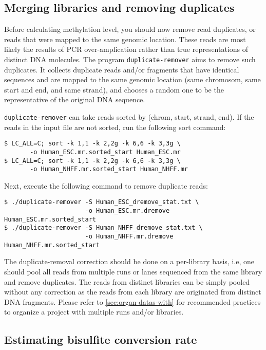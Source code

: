 \documentclass[10pt]{article}
\newcommand{\prog}[1]{\texttt{#1}}
\begin{document}
\subsection{Merging libraries and removing duplicates}
\label{sec:mapping}

Before calculating methylation level, you should now remove read
duplicates, or reads that were mapped to the same genomic
location. These reads are most likely the results of PCR
over-amplication rather than true representations of distinct DNA
molecules. The program \prog{duplicate-remover} aims to remove such
duplicates. It collects duplicate reads and/or fragments that have
identical sequences and are mapped to the same genomic location (same
chromosom, same start and end, and same strand), and chooses a random
one to be the representative of the original DNA sequence.

\prog{duplicate-remover} can take reads sorted by (chrom, start,
strand, end). If the reads in the input file are not sorted, run the
following sort command:
\begin{verbatim}
$ LC_ALL=C; sort -k 1,1 -k 2,2g -k 6,6 -k 3,3g \
       -o Human_ESC.mr.sorted_start Human_ESC.mr
$ LC_ALL=C; sort -k 1,1 -k 2,2g -k 6,6 -k 3,3g \
       -o Human_NHFF.mr.sorted_start Human_NHFF.mr
\end{verbatim}
Next, execute the following command to remove duplicate reads:
\begin{verbatim}
$ ./duplicate-remover -S Human_ESC_dremove_stat.txt \
                      -o Human_ESC.mr.dremove Human_ESC.mr.sorted_start
$ ./duplicate-remover -S Human_NHFF_dremove_stat.txt \
                      -o Human_NHFF.mr.dremove Human_NHFF.mr.sorted_start
\end{verbatim}
The duplicate-removal correction should be done on a per-library
basis, i.e, one should pool all reads from multiple runs or lanes
sequenced from the same library and remove duplicates. The reads from
distinct libraries can be simply pooled without any correction as the
reads from each library are originated from distinct DNA
fragments. Please refer to \ref{sec:organ-datas-with} for recommended
practices to organize a project with multiple runs and/or libraries.


\subsection{Estimating bisulfite conversion rate}
\label{sec:estim-busilf-conv}
\end{document}
